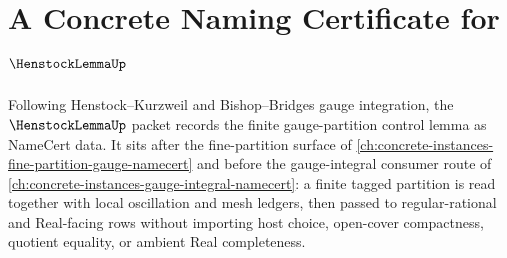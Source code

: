 \chapter{A Concrete Naming Certificate for $\HenstockLemmaUp$}
\label{ch:concrete-instances-henstock-lemma-namecert}

Following Henstock--Kurzweil and Bishop--Bridges gauge integration, the $\HenstockLemmaUp$ packet records the finite gauge-partition control lemma as NameCert data. It sits after the fine-partition surface of \autoref{ch:concrete-instances-fine-partition-gauge-namecert} and before the gauge-integral consumer route of \autoref{ch:concrete-instances-gauge-integral-namecert}: a finite tagged partition is read together with local oscillation and mesh ledgers, then passed to regular-rational and Real-facing rows without importing host choice, open-cover compactness, quotient equality, or ambient Real completeness.

